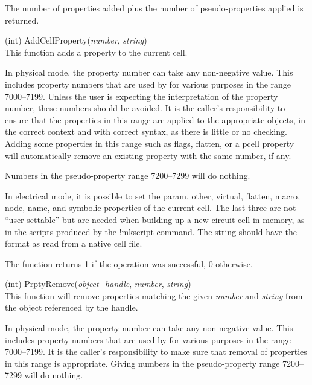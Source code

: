 \begin{description}
The number of properties added plus the number of pseudo-properties
applied is returned.

\item{(int) \vt AddCellProperty({\it number}, {\it string})}\\
This function adds a property to the current cell.

In physical mode, the property number can take any non-negative value. 
This includes property numbers that are used by {\Xic} for various
purposes in the range 7000--7199.  Unless the user is expecting the
{\Xic} interpretation of the property number, these numbers should be
avoided.  It is the caller's responsibility to ensure that the
properties in this range are applied to the appropriate objects, in
the correct context and with correct syntax, as there is little or no
checking.  Adding some properties in this range such as {\et flags},
{\et flatten}, or a pcell property will automatically remove an
existing property with the same number, if any.

Numbers in the pseudo-property range 7200--7299 will do nothing.

In electrical mode, it is possible to set the {\et param}, {\et
other}, {\et virtual}, {\et flatten}, {\et macro}, {\et node}, {\et
name}, and {\et symbolic} properties of the current cell.  The last
three are not ``user settable'' but are needed when building up a new
circuit cell in memory, as in the scripts produced by the {\cb
!mkscript} command.  The string should have the format as read from a
native cell file.

The function returns 1 if the operation was successful, 0 otherwise.

\item{(int) \vt PrptyRemove({\it object\_handle}, {\it number\/},
 {\it string\/})}\\
This function will remove properties matching the given {\it number}
and {\it string} from the object referenced by the handle.

In physical mode, the property number can take any non-negative value. 
This includes property numbers that are used by {\Xic} for various
purposes in the range 7000--7199.  It is the caller's responsibility
to make sure that removal of properties in this range is appropriate. 
Giving numbers in the pseudo-property range 7200--7299 will do
nothing.


\end{description}
